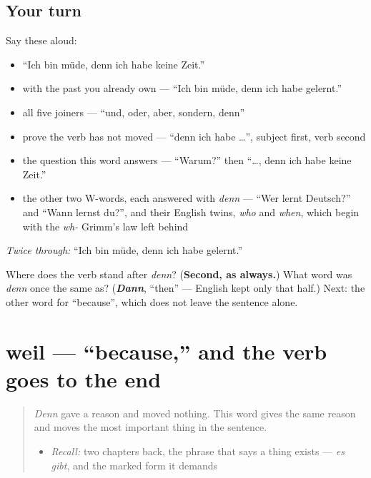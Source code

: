 \subsection*{Your turn}
Say these aloud:

\begin{itemize}
\raggedright
  \item \textquotedblleft{}Ich bin müde, denn ich habe keine Zeit.\textquotedblright{}
  \item with the past you already own — \textquotedblleft{}Ich bin müde, denn ich habe gelernt.\textquotedblright{}
  \item all five joiners — \textquotedblleft{}und, oder, aber, sondern, denn\textquotedblright{}
  \item prove the verb has not moved — \textquotedblleft{}denn ich habe …\textquotedblright{}, subject first, verb second
  \item the question this word answers — \textquotedblleft{}Warum?\textquotedblright{} then \textquotedblleft{}…, denn ich habe keine Zeit.\textquotedblright{}
  \item the other two W-words, each answered with \emph{denn} — \textquotedblleft{}Wer lernt Deutsch?\textquotedblright{} and \textquotedblleft{}Wann lernst du?\textquotedblright{}, and their English twins, \emph{who} and \emph{when}, which begin with the \emph{wh-} Grimm's law left behind
\end{itemize}

\emph{Twice through:} \textquotedblleft{}Ich bin müde, denn ich habe gelernt.\textquotedblright{}

\begin{tcolorbox}[breakable,colback=teal!4,colframe=teal!35!black,title={Before you move on}]
Where does the verb stand after \emph{denn}? (\textbf{Second, as always.}) What word was \emph{denn} once the same as? (\emph{\textbf{Dann}}, \textquotedblleft{}then\textquotedblright{} — English kept only that half.) Next: the other word for \textquotedblleft{}because\textquotedblright{}, which does not leave the sentence alone.
\end{tcolorbox}
\section[weil]{weil — \textquotedblleft{}because,\textquotedblright{} and the verb goes to the end}

\label{lesson:GE-C35-weil}



\begin{quote}
\emph{Denn} gave a reason and moved nothing. This word gives the same reason and moves the most important thing in the sentence.

\begin{itemize}
\raggedright
  \item \emph{Recall:} two chapters back, the phrase that says a thing exists — \emph{es gibt}, and the marked form it demands
\end{itemize}
\end{quote}

